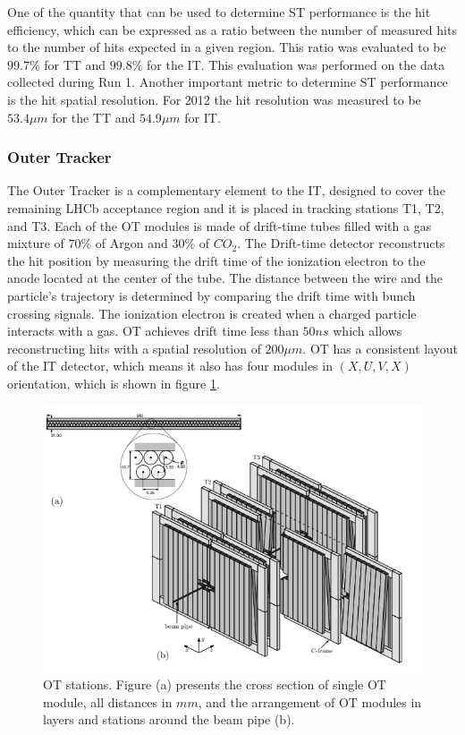 One of the quantity that can be used to determine ST performance is the hit efficiency, which can be expressed as a ratio between the number of measured hits to the number of hits expected in a given region. This ratio was evaluated to be $99.7\%$ for TT and $99.8\%$ for the IT. This evaluation was performed on the data collected during Run 1. Another important metric to determine ST performance is the hit spatial resolution.  For 2012 the hit resolution was measured to be $53.4 \mu m$ for the TT and $54.9 \mu m$ for IT.  


\subsubsection{Outer Tracker}

 The Outer Tracker is a complementary element to the IT, designed to cover the remaining LHCb acceptance region and it is placed in tracking stations T1, T2, and T3.  Each of the OT modules is made of drift-time tubes filled with a gas mixture of $70\%$ of Argon and $30\%$ of $CO_2$. 
The Drift-time detector reconstructs the hit position by measuring the drift time of the ionization electron to the anode located at the center of the tube. The distance between the wire and the particle’s trajectory is determined by comparing the drift time with bunch crossing signals.  The ionization electron is created when a charged particle interacts with a gas. 
OT achieves drift time less than $50 ns$ which allows reconstructing hits with a spatial resolution of $200 \mu m$.   
OT has a consistent layout of the IT detector, which means it also has four modules in  $(X, U, V, X)$ orientation, which is shown in figure \ref{fig:OT}. 


\begin{figure}[h]
\centering
\includegraphics[scale=0.8]{figures/OT.PNG}
\caption{OT stations. Figure (a) presents the cross section of single OT module, all distances in $mm$, and the arrangement of OT modules in layers and stations around the beam pipe (b).  
\label{fig:OT}}
\end{figure}

